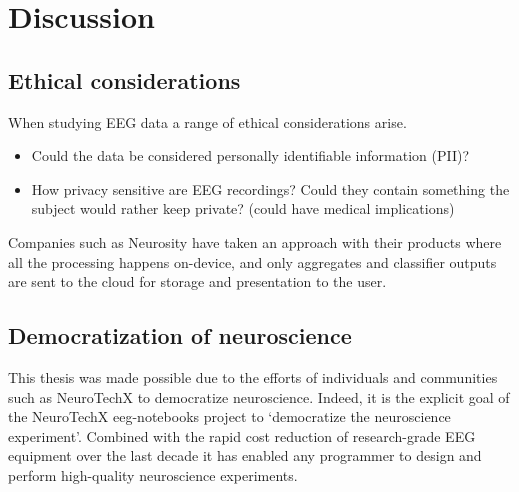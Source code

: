 \section{Discussion}

\subsection{Ethical considerations}

    When studying EEG data a range of ethical considerations arise. 

    \begin{itemize}
        \item Could the data be considered personally identifiable information (PII)? 
        \item How privacy sensitive are EEG recordings? Could they contain something the subject would rather keep private? (could have medical implications)
    \end{itemize}

    Companies such as Neurosity have taken an approach with their products where all the processing happens on-device, and only aggregates and classifier outputs are sent to the cloud for storage and presentation to the user.



\subsection{Democratization of neuroscience}


    This thesis was made possible due to the efforts of individuals and communities such as NeuroTechX to democratize neuroscience. Indeed, it is the explicit goal of the NeuroTechX eeg-notebooks project to `democratize the neuroscience experiment'. Combined with the rapid cost reduction of research-grade EEG equipment over the last decade it has enabled any programmer to design and perform high-quality neuroscience experiments.

